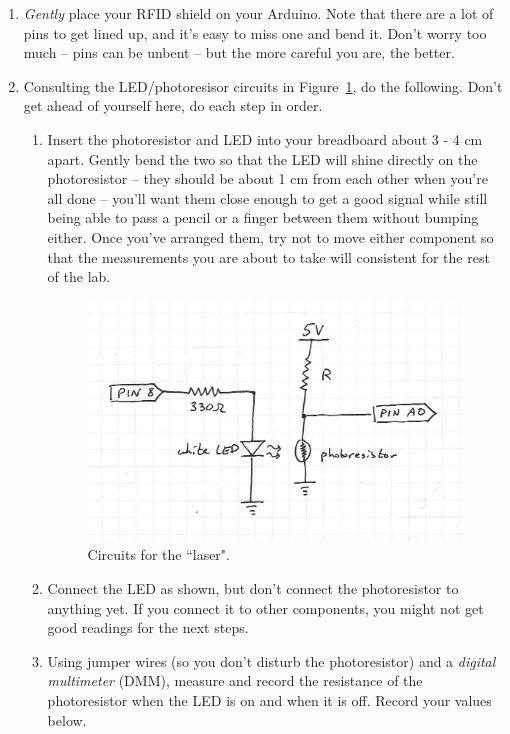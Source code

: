 \documentclass[11pt]{article} %
\begin{document}
\begin{enumerate}
\item \emph{Gently} place your RFID shield on your Arduino. Note that there are a lot of pins to get lined up, and it's easy to miss one and bend it. Don't worry too much -- pins can be unbent -- but the more careful you are, the better.
\item Consulting the LED/photoresisor circuits in Figure~\ref{fig:laser}, do the following. Don't get ahead of yourself here, do each step in order.
\begin{enumerate}
    \item Insert the photoresistor and LED into your breadboard about 3 - 4 cm apart. Gently bend the two so that the LED will shine directly on the photoresistor -- they should be about 1 cm from each other when you're all done -- you’ll want them close enough to get a good signal while still being able to pass a pencil or a finger between them without bumping either. Once you've arranged them, try not to move either component so that the measurements you are about to take will consistent for the rest of the lab.

\begin{figure}[htbp]
\begin{center}
\includegraphics[width=4in]{figures/laser.png}
\caption{Circuits for the ``laser".}
\label{fig:laser}
\end{center}
\end{figure}

    \item Connect the LED as shown, but don't connect the photoresistor to anything yet. If you connect it to other components, you might not get good readings for the next steps.
    \item Using jumper wires (so you don’t disturb the photoresistor) and a \emph{digital multimeter} (DMM), measure and record the resistance of the photoresistor when the LED is on and when it is off. Record your values below.
    

\end{enumerate}
\end{enumerate}
\end{document}
